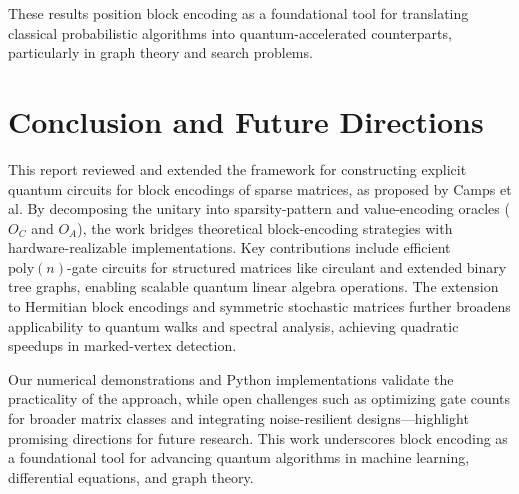 \documentclass{article}
\begin{document}
    These results position block encoding as a foundational tool for translating classical probabilistic algorithms into quantum-accelerated counterparts, particularly in graph theory and search problems.

    \section{Conclusion and Future Directions}
    
    This report reviewed and extended the framework for constructing explicit quantum circuits for block encodings of sparse matrices, as proposed by Camps et al. By decomposing the unitary into sparsity-pattern and value-encoding oracles ($O_C$ and $O_A$), the work bridges theoretical block-encoding strategies with hardware-realizable implementations. Key contributions include efficient $\mathrm{poly}(n)$-gate circuits for structured matrices like circulant and extended binary tree graphs, enabling scalable quantum linear algebra operations. The extension to Hermitian block encodings and symmetric stochastic matrices further broadens applicability to quantum walks and spectral analysis, achieving quadratic speedups in marked-vertex detection.
    
    Our numerical demonstrations and Python implementations validate the practicality of the approach, while open challenges such as optimizing gate counts for broader matrix classes and integrating noise-resilient designs—highlight promising directions for future research. This work underscores block encoding as a foundational tool for advancing quantum algorithms in machine learning, differential equations, and graph theory.

    
    
\end{document}
